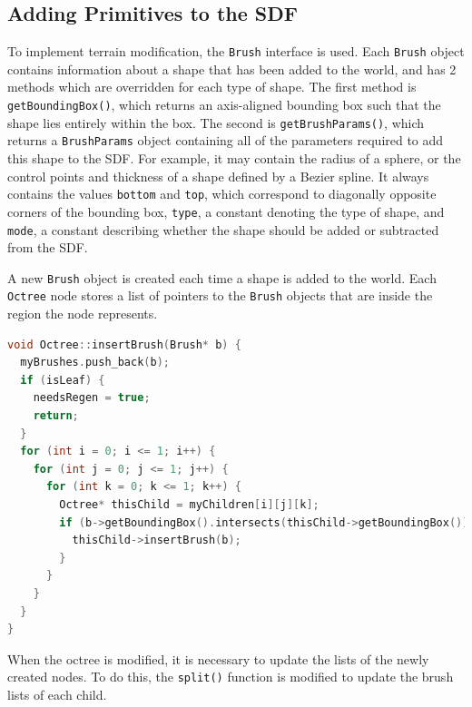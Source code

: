 \documentclass[11pt]{article}
\begin{document}
\subsection{Adding Primitives to the SDF}
\label{section:modification_implementation}

To implement terrain modification, the \texttt{Brush} interface is used. Each \texttt{Brush} object contains information about a shape that has been added to the world, and has 2 methods which are overridden for each type of shape. The first method is \texttt{getBoundingBox()}, which returns an axis-aligned bounding box such that the shape lies entirely within the box. The second is \texttt{getBrushParams()}, which returns a \texttt{BrushParams} object containing all of the parameters required to add this shape to the SDF. For example, it may contain the radius of a sphere, or the control points and thickness of a shape defined by a Bezier spline. It always contains the values \texttt{bottom} and \texttt{top}, which correspond to diagonally opposite corners of the bounding box, \texttt{type}, a constant denoting the type of shape, and \texttt{mode}, a constant describing whether the shape should be added or subtracted from the SDF.

A new \texttt{Brush} object is created each time a shape is added to the world. Each \texttt{Octree} node stores a list of pointers to the \texttt{Brush} objects that are inside the region the node represents. 

\begin{lstlisting}[language=C++,label={edit_add},caption={Code to add a new brush into the octree. The brush is added recursively to lists at all levels, so each leaf has a list of exactly the brushes that are partially inside it. The flag \texttt{needsRegen} indicates that the geometry within the chunk has changed.}]
void Octree::insertBrush(Brush* b) {
  myBrushes.push_back(b);
  if (isLeaf) {
    needsRegen = true;
    return;
  }
  for (int i = 0; i <= 1; i++) {
    for (int j = 0; j <= 1; j++) {
      for (int k = 0; k <= 1; k++) {
        Octree* thisChild = myChildren[i][j][k];
        if (b->getBoundingBox().intersects(thisChild->getBoundingBox())) {
          thisChild->insertBrush(b);
        }
      }
    }
  }
}
\end{lstlisting}

When the octree is modified, it is necessary to update the lists of the newly created nodes. To do this, the \texttt{split()} function is modified to update the brush lists of each child.
\end{document}
